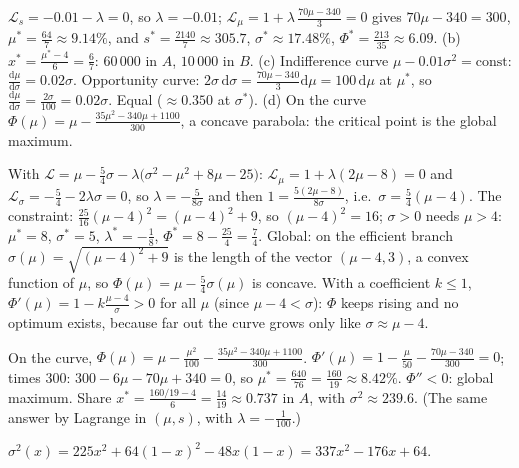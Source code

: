 \begin{solutions}
        $\mathcal{L}_s=-0.01-\lambda=0$, so $\lambda=-0.01$;
        $\mathcal{L}_\mu=1+\lambda\,\tfrac{70\mu-340}{3}=0$ gives
        $70\mu-340=300$, $\mu^*=\tfrac{64}{7}\approx9.14\%$, and
        $s^*=\tfrac{2140}{7}\approx305.7$, $\sigma^*\approx17.48\%$,
        $\Phi^*=\tfrac{213}{35}\approx6.09$.
        (b) $x^*=\tfrac{\mu^*-4}{6}=\tfrac67$: $60\,000$ in $A$, $10\,000$ in
        $B$.
        (c) Indifference curve $\mu-0.01\sigma^{2}=\text{const}$:
        $\tfrac{\mathrm{d}\mu}{\mathrm{d}\sigma}=0.02\sigma$. Opportunity
        curve: $2\sigma\,\mathrm{d}\sigma=\tfrac{70\mu-340}{3}\mathrm{d}\mu
        =100\,\mathrm{d}\mu$ at $\mu^*$, so
        $\tfrac{\mathrm{d}\mu}{\mathrm{d}\sigma}=\tfrac{2\sigma}{100}
        =0.02\sigma$. Equal ($\approx0.350$ at $\sigma^*$).
        (d) On the curve $\Phi(\mu)=\mu-\tfrac{35\mu^{2}-340\mu+1100}{300}$,
        a concave parabola: the critical point is the global maximum.
  \item With $\mathcal{L}=\mu-\tfrac54\sigma-\lambda\bigl(\sigma^{2}-\mu^{2}+8\mu-25\bigr)$:
        $\mathcal{L}_\mu=1+\lambda(2\mu-8)=0$ and
        $\mathcal{L}_\sigma=-\tfrac54-2\lambda\sigma=0$, so
        $\lambda=-\tfrac{5}{8\sigma}$ and then
        $1=\tfrac{5(2\mu-8)}{8\sigma}$, i.e.\ $\sigma=\tfrac54(\mu-4)$.
        The constraint: $\tfrac{25}{16}(\mu-4)^{2}=(\mu-4)^{2}+9$, so
        $(\mu-4)^{2}=16$; $\sigma>0$ needs $\mu>4$: $\mu^*=8$, $\sigma^*=5$,
        $\lambda^*=-\tfrac18$, $\Phi^*=8-\tfrac{25}{4}=\tfrac74$. Global: on
        the efficient branch $\sigma(\mu)=\sqrt{(\mu-4)^{2}+9}$ is the length
        of the vector $(\mu-4,3)$, a convex function of $\mu$, so
        $\Phi(\mu)=\mu-\tfrac54\sigma(\mu)$ is concave. With a coefficient
        $k\le1$, $\Phi'(\mu)=1-k\tfrac{\mu-4}{\sigma}>0$ for all $\mu$ (since
        $\mu-4<\sigma$): $\Phi$ keeps rising and no optimum exists, because
        far out the curve grows only like $\sigma\approx\mu-4$.
  \item On the curve,
        $\Phi(\mu)=\mu-\tfrac{\mu^{2}}{100}-\tfrac{35\mu^{2}-340\mu+1100}{300}$.
        $\Phi'(\mu)=1-\tfrac{\mu}{50}-\tfrac{70\mu-340}{300}=0$; times $300$:
        $300-6\mu-70\mu+340=0$, so $\mu^*=\tfrac{640}{76}=\tfrac{160}{19}
        \approx8.42\%$. $\Phi''<0$: global maximum. Share
        $x^*=\tfrac{160/19-4}{6}=\tfrac{14}{19}\approx0.737$ in $A$, with
        $\sigma^{2}\approx239.6$. (The same answer by Lagrange in $(\mu,s)$,
        with $\lambda=-\tfrac1{100}$.)
  \item $\sigma^{2}(x)=225x^{2}+64(1-x)^{2}-48x(1-x)=337x^{2}-176x+64$.

\end{solutions}
